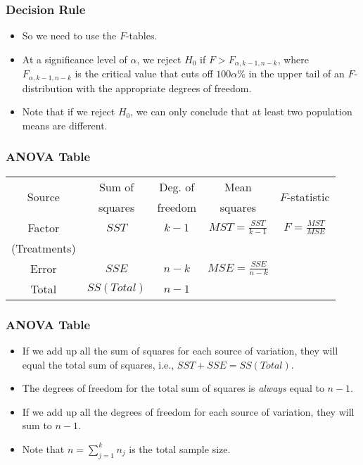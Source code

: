 \documentclass[12pt]{beamer}
\begin{document}
\begin{frame}
	\frametitle{Decision Rule}
	
	\begin{itemize}[label={\color{blue}$\blacktriangleright$}]
		\item So we need to use the $F$-tables.
		
		\item At a significance level of $\alpha$, we reject $H_0$ if $F > F_{\alpha,k-1,n-k}$, where $F_{\alpha,k-1,n-k}$ is the critical value that cuts off $100\alpha\%$ in the upper tail of an $F$-distribution with the appropriate degrees of freedom.
		
		\item Note that if we reject $H_0$, we can only conclude that at least two population means are different.
	\end{itemize}
	
\end{frame}
\begin{frame}
	\frametitle{ANOVA Table}
	
	\begin{table}
		\centering
		\begin{tabular}{ccccc}
			\toprule
			\multirow{2}{*}{Source} & Sum of & Deg. of & Mean& \multirow{2}{*}{$F$-statistic} \\
			& squares & freedom & squares& \\
			\midrule
			Factor & $SST$ & $k-1$ & $MST = \frac{SST}{k-1}$ & $F = \frac{MST}{MSE}$ \\
			(Treatments) & & & & \\
			Error & $SSE$ & $n-k$ & $MSE = \frac{SSE}{n-k}$ & \\
			\midrule
			Total & $SS(Total)$ & $n-1$ & & \\
			\bottomrule
		\end{tabular}
	\end{table}
	
\end{frame}
\begin{frame}
	\frametitle{ANOVA Table}
	
	\begin{itemize}[label={\color{blue}$\blacktriangleright$}]
		\item If we add up all the sum of squares for each source of variation, they will equal the total sum of squares, i.e., $SST + SSE = SS(Total)$.
		
		\item The degrees of freedom for the total sum of squares is \textit{always} equal to $n - 1$.
		
		\item If we add up all the degrees of freedom for each source of variation, they will sum to $n - 1$.
		
		\item Note that $n = \sum_{j=1}^k n_j$ is the total sample size.
	\end{itemize}
	
\end{frame}
\end{document}
